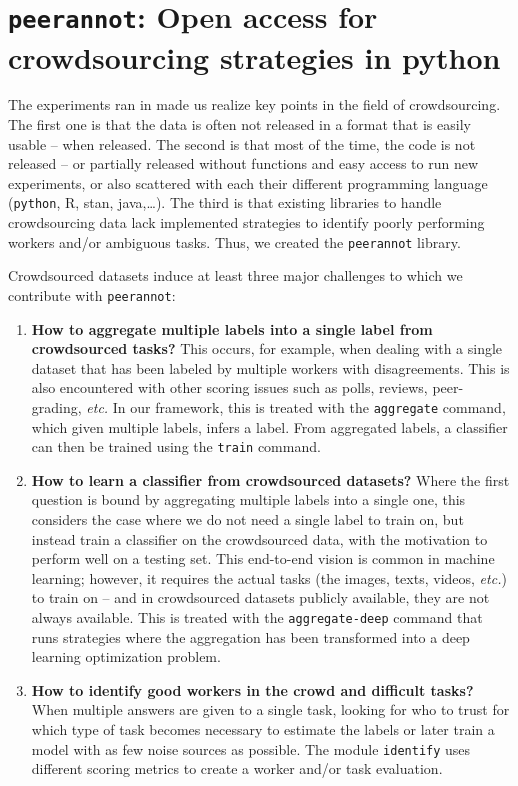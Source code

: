 \section{\texttt{peerannot}: Open access for crowdsourcing strategies in python}

The experiments ran in  made us realize key points in the field of crowdsourcing. The first one is that the data is often not released in a format that is easily usable -- when released. The second is that most of the time, the code is not released -- or partially released without functions and easy access to run new experiments, or also scattered with each their different programming language (\texttt{python}, R, stan, java,\dots). The third is that existing libraries to handle crowdsourcing data lack implemented strategies to identify poorly performing workers and/or ambiguous tasks.
Thus, we created the \texttt{peerannot} library.

Crowdsourced datasets induce at least three major challenges to which we contribute with \texttt{peerannot}:

\begin{enumerate}
  \item \textbf{How to aggregate multiple labels into a single label from crowdsourced tasks?} This occurs, for example, when dealing with a single dataset that has been labeled by multiple workers with disagreements. This is also encountered with other scoring issues such as polls, reviews, peer-grading, \textit{etc.} In our framework, this is treated with the \texttt{aggregate} command, which given multiple labels, infers a label. From aggregated labels, a classifier can then be trained using the \texttt{train} command.
  \item \textbf{How to learn a classifier from crowdsourced datasets?} Where the first question is bound by aggregating multiple labels into a single one, this considers the case where we do not need a single label to train on, but instead train a classifier on the crowdsourced data, with the motivation to perform well on a testing set. This end-to-end vision is common in machine learning; however, it requires the actual tasks (the images, texts, videos, \textit{etc.}) to train on -- and in crowdsourced datasets publicly available, they are not always available. This is treated with the \texttt{aggregate-deep} command that runs strategies where the aggregation has been transformed into a deep learning optimization problem.
  \item \textbf{How to identify good workers in the crowd and difficult tasks?} When multiple answers are given to a single task, looking for who to trust for which type of task becomes necessary to estimate the labels or later train a model with as few noise sources as possible. The module \texttt{identify} uses different scoring metrics to create a worker and/or task evaluation.
\end{enumerate}

